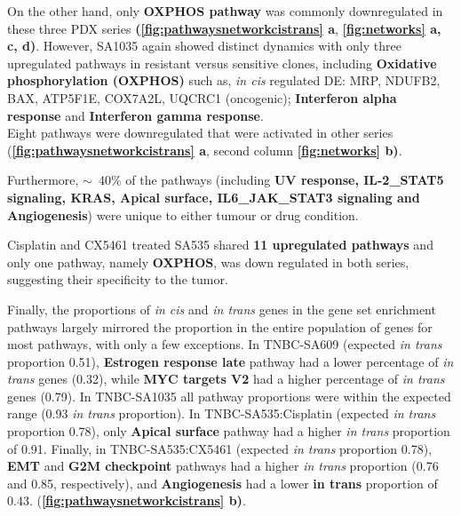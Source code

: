  On the other hand, only \textbf{OXPHOS pathway} was commonly downregulated in these three PDX series \textbf{(\autoref{fig:pathwaysnetworkcistrans} a}, \textbf{\autoref{fig:networks} a, c, d)}. However, SA1035 again showed distinct dynamics with only three upregulated pathways in resistant versus sensitive clones, including \textbf{Oxidative phosphorylation (OXPHOS)} such as, \textit{in cis} regulated DE: MRP, NDUFB2, BAX, ATP5F1E, COX7A2L, UQCRC1 (oncogenic); 
\textbf{Interferon alpha response} and \textbf{Interferon gamma response}. 
\\
Eight pathways were downregulated that were activated in other series (\textbf{\autoref{fig:pathwaysnetworkcistrans} a}, second column  \textbf{\autoref{fig:networks} b)}. 
 
Furthermore, $\sim$~40\% of the pathways (including \textbf{UV response, IL-2\_STAT5 signaling, KRAS, Apical surface, IL6\_JAK\_STAT3 signaling and Angiogenesis})  were unique to either tumour or drug condition. 

Cisplatin and CX5461 treated SA535 shared \textbf{11 upregulated pathways} and only one pathway, namely \textbf{\ac{OXPHOS}}, was down regulated in both series, suggesting their specificity to the tumor.


Finally, the proportions of \textit{in cis} and \textit{in trans} genes in the gene set enrichment pathways largely mirrored the proportion in the entire population of genes for most pathways, with only a few exceptions. In TNBC-SA609 (expected \textit{in trans} proportion 0.51), \textbf{Estrogen response late} pathway had a lower percentage of \textit{in trans} genes (0.32), while \textbf{MYC targets V2} had a higher percentage of \textit{in trans} genes (0.79). In TNBC-SA1035 all pathway proportions were within the expected range (0.93 \textit{in trans} proportion). In TNBC-SA535:Cisplatin (expected \textit{in trans} proportion 0.78), only \textbf{Apical surface} pathway had a higher \textit{in trans} proportion of 0.91. Finally, in TNBC-SA535:CX5461 (expected \textit{in trans} proportion 0.78), \textbf{EMT} and \textbf{G2M checkpoint} pathways had a higher \textit{in trans} proportion (0.76 and 0.85, respectively), and \textbf{Angiogenesis} had a lower \textbf{in trans} proportion of 0.43. (\textbf{\autoref{fig:pathwaysnetworkcistrans} b)}.


